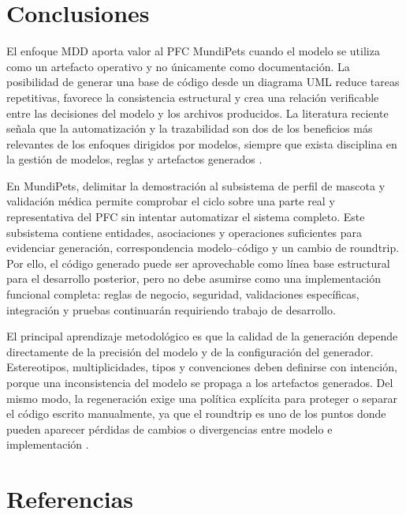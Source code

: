 \documentclass[journal,onecolumn]{IEEEtran}
\begin{document}
	\section{Conclusiones}
	
	El enfoque MDD aporta valor al PFC MundiPets cuando el modelo se utiliza como un artefacto operativo y no únicamente como documentación. La posibilidad de generar una base de código desde un diagrama UML reduce tareas repetitivas, favorece la consistencia estructural y crea una relación verificable entre las decisiones del modelo y los archivos producidos. La literatura reciente señala que la automatización y la trazabilidad son dos de los beneficios más relevantes de los enfoques dirigidos por modelos, siempre que exista disciplina en la gestión de modelos, reglas y artefactos generados \cite{sebastian2020codegen, david2023collaborative, krouwel2024enterprise}.
	
	En MundiPets, delimitar la demostración al subsistema de perfil de mascota y validación médica permite comprobar el ciclo sobre una parte real y representativa del PFC sin intentar automatizar el sistema completo. Este subsistema contiene entidades, asociaciones y operaciones suficientes para evidenciar generación, correspondencia modelo--código y un cambio de roundtrip. Por ello, el código generado puede ser aprovechable como línea base estructural para el desarrollo posterior, pero no debe asumirse como una implementación funcional completa: reglas de negocio, seguridad, validaciones específicas, integración y pruebas continuarán requiriendo trabajo de desarrollo.
	
	El principal aprendizaje metodológico es que la calidad de la generación depende directamente de la precisión del modelo y de la configuración del generador. Estereotipos, multiplicidades, tipos y convenciones deben definirse con intención, porque una inconsistencia del modelo se propaga a los artefactos generados. Del mismo modo, la regeneración exige una política explícita para proteger o separar el código escrito manualmente, ya que el roundtrip es uno de los puntos donde pueden aparecer pérdidas de cambios o divergencias entre modelo e implementación \cite{almutairi2022roundtrip}.
	
	\section{Referencias}
	
\end{document}
